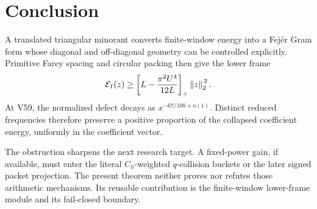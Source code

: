 \section{Conclusion}

A translated triangular minorant converts finite-window energy into a Fejér
Gram form whose diagonal and off-diagonal geometry can be controlled
explicitly.  Primitive Farey spacing and circular packing then give the lower
frame
\[
\mathcal{E}_I(z)\geq
\left[L-\frac{\pi^2U^4}{12L}\right]_{+}\left\lVert z\right\rVert_{2}^{\,2}.
\]
At V59, the normalized defect decays as
\(x^{-67/100+o(1)}\).  Distinct reduced frequencies therefore preserve a
positive proportion of the collapsed coefficient energy, uniformly in the
coefficient vector.

The obstruction sharpens the next research target.  A fixed-power gain, if
available, must enter the literal \(C_h\)-weighted \(q\)-collision buckets or
the later signed packet projection.  The present theorem neither proves nor
refutes those arithmetic mechanisms.  Its reusable contribution is the
finite-window lower-frame module and its fail-closed boundary.
